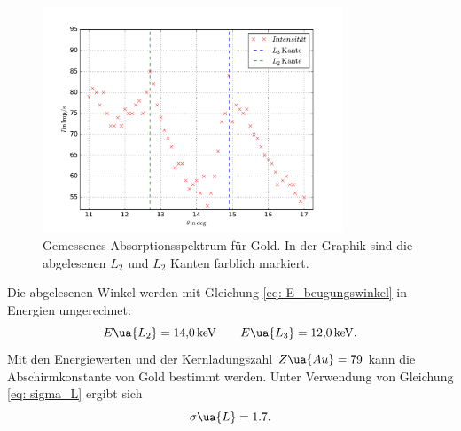 \begin{figure}
  \centering
  \includegraphics[width=0.8\textwidth]{../Messdaten/gold.pdf}
  \caption{Gemessenes Absorptionsspektrum für Gold. In der Graphik sind die abgelesenen $L_2$ und $L_2$ Kanten farblich markiert.} %
  \label{fig: absotp_gold}
\end{figure}
Die abgelesenen Winkel werden mit Gleichung \eqref{eq: E_beugungswinkel} in Energien umgerechnet:
\begin{equation}
  \label{eq:l_kanten_gold}
  E\ua{L_2}=\SI{14.0}{\kilo\eV}  \qquad   E\ua{L_3}=\SI{12.0}{\kilo\eV}.
\end{equation}
Mit den Energiewerten und der Kernladungszahl $Z\ua{Au}=79$ kann die Abschirmkonstante
von Gold bestimmt werden. Unter Verwendung von Gleichung \eqref{eq: sigma_L} ergibt sich
\begin{equation*}
    \sigma\ua{L}=1.7.
\end{equation*}

\FloatBarrier
\FloatBarrier
